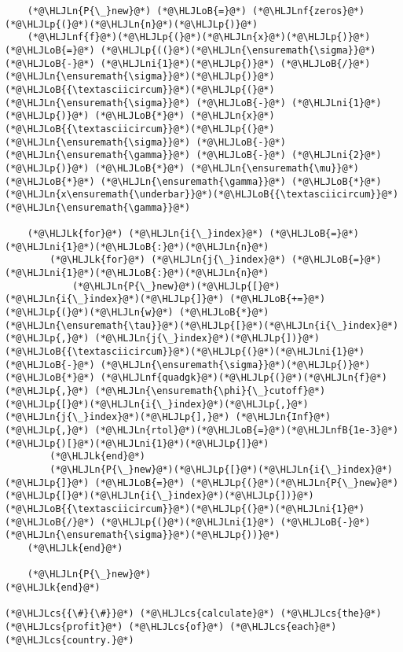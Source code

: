 \documentclass[12pt,a4paper]{article}
\newcommand{\HLJLk}[1]{\textcolor[RGB]{148,91,176}{\textbf{#1}}}
\newcommand{\HLJLn}[1]{#1}
\newcommand{\HLJLnf}[1]{\textcolor[RGB]{66,102,213}{#1}}
\newcommand{\HLJLnfB}[1]{\textcolor[RGB]{59,151,46}{#1}}
\newcommand{\HLJLni}[1]{\textcolor[RGB]{59,151,46}{#1}}
\newcommand{\HLJLoB}[1]{\textcolor[RGB]{102,102,102}{\textbf{#1}}}
\newcommand{\HLJLp}[1]{#1}
\newcommand{\HLJLcs}[1]{\textcolor[RGB]{153,153,119}{\textit{#1}}}
\begin{document}
\begin{lstlisting}
    (*@\HLJLn{P{\_}new}@*) (*@\HLJLoB{=}@*) (*@\HLJLnf{zeros}@*)(*@\HLJLp{(}@*)(*@\HLJLn{n}@*)(*@\HLJLp{)}@*)
    (*@\HLJLnf{f}@*)(*@\HLJLp{(}@*)(*@\HLJLn{x}@*)(*@\HLJLp{)}@*) (*@\HLJLoB{=}@*) (*@\HLJLp{((}@*)(*@\HLJLn{\ensuremath{\sigma}}@*) (*@\HLJLoB{-}@*) (*@\HLJLni{1}@*)(*@\HLJLp{)}@*) (*@\HLJLoB{/}@*) (*@\HLJLn{\ensuremath{\sigma}}@*)(*@\HLJLp{)}@*)(*@\HLJLoB{{\textasciicircum}}@*)(*@\HLJLp{(}@*)(*@\HLJLn{\ensuremath{\sigma}}@*) (*@\HLJLoB{-}@*) (*@\HLJLni{1}@*)(*@\HLJLp{)}@*) (*@\HLJLoB{*}@*) (*@\HLJLn{x}@*)(*@\HLJLoB{{\textasciicircum}}@*)(*@\HLJLp{(}@*)(*@\HLJLn{\ensuremath{\sigma}}@*) (*@\HLJLoB{-}@*) (*@\HLJLn{\ensuremath{\gamma}}@*) (*@\HLJLoB{-}@*) (*@\HLJLni{2}@*)(*@\HLJLp{)}@*) (*@\HLJLoB{*}@*) (*@\HLJLn{\ensuremath{\mu}}@*) (*@\HLJLoB{*}@*) (*@\HLJLn{\ensuremath{\gamma}}@*) (*@\HLJLoB{*}@*) (*@\HLJLn{x\ensuremath{\underbar}}@*)(*@\HLJLoB{{\textasciicircum}}@*)(*@\HLJLn{\ensuremath{\gamma}}@*)

    (*@\HLJLk{for}@*) (*@\HLJLn{i{\_}index}@*) (*@\HLJLoB{=}@*) (*@\HLJLni{1}@*)(*@\HLJLoB{:}@*)(*@\HLJLn{n}@*)
        (*@\HLJLk{for}@*) (*@\HLJLn{j{\_}index}@*) (*@\HLJLoB{=}@*) (*@\HLJLni{1}@*)(*@\HLJLoB{:}@*)(*@\HLJLn{n}@*)
            (*@\HLJLn{P{\_}new}@*)(*@\HLJLp{[}@*)(*@\HLJLn{i{\_}index}@*)(*@\HLJLp{]}@*) (*@\HLJLoB{+=}@*) (*@\HLJLp{(}@*)(*@\HLJLn{w}@*) (*@\HLJLoB{*}@*) (*@\HLJLn{\ensuremath{\tau}}@*)(*@\HLJLp{[}@*)(*@\HLJLn{i{\_}index}@*)(*@\HLJLp{,}@*) (*@\HLJLn{j{\_}index}@*)(*@\HLJLp{])}@*)(*@\HLJLoB{{\textasciicircum}}@*)(*@\HLJLp{(}@*)(*@\HLJLni{1}@*) (*@\HLJLoB{-}@*) (*@\HLJLn{\ensuremath{\sigma}}@*)(*@\HLJLp{)}@*) (*@\HLJLoB{*}@*) (*@\HLJLnf{quadgk}@*)(*@\HLJLp{(}@*)(*@\HLJLn{f}@*)(*@\HLJLp{,}@*) (*@\HLJLn{\ensuremath{\phi}{\_}cutoff}@*)(*@\HLJLp{[}@*)(*@\HLJLn{i{\_}index}@*)(*@\HLJLp{,}@*) (*@\HLJLn{j{\_}index}@*)(*@\HLJLp{],}@*) (*@\HLJLn{Inf}@*)(*@\HLJLp{,}@*) (*@\HLJLn{rtol}@*)(*@\HLJLoB{=}@*)(*@\HLJLnfB{1e-3}@*)(*@\HLJLp{)[}@*)(*@\HLJLni{1}@*)(*@\HLJLp{]}@*)
        (*@\HLJLk{end}@*)
        (*@\HLJLn{P{\_}new}@*)(*@\HLJLp{[}@*)(*@\HLJLn{i{\_}index}@*)(*@\HLJLp{]}@*) (*@\HLJLoB{=}@*) (*@\HLJLp{(}@*)(*@\HLJLn{P{\_}new}@*)(*@\HLJLp{[}@*)(*@\HLJLn{i{\_}index}@*)(*@\HLJLp{])}@*)(*@\HLJLoB{{\textasciicircum}}@*)(*@\HLJLp{(}@*)(*@\HLJLni{1}@*) (*@\HLJLoB{/}@*) (*@\HLJLp{(}@*)(*@\HLJLni{1}@*) (*@\HLJLoB{-}@*) (*@\HLJLn{\ensuremath{\sigma}}@*)(*@\HLJLp{))}@*)
    (*@\HLJLk{end}@*)

    (*@\HLJLn{P{\_}new}@*)
(*@\HLJLk{end}@*)

(*@\HLJLcs{{\#}{\#}}@*) (*@\HLJLcs{calculate}@*) (*@\HLJLcs{the}@*) (*@\HLJLcs{profit}@*) (*@\HLJLcs{of}@*) (*@\HLJLcs{each}@*) (*@\HLJLcs{country.}@*)


\end{lstlisting}
\end{document}
